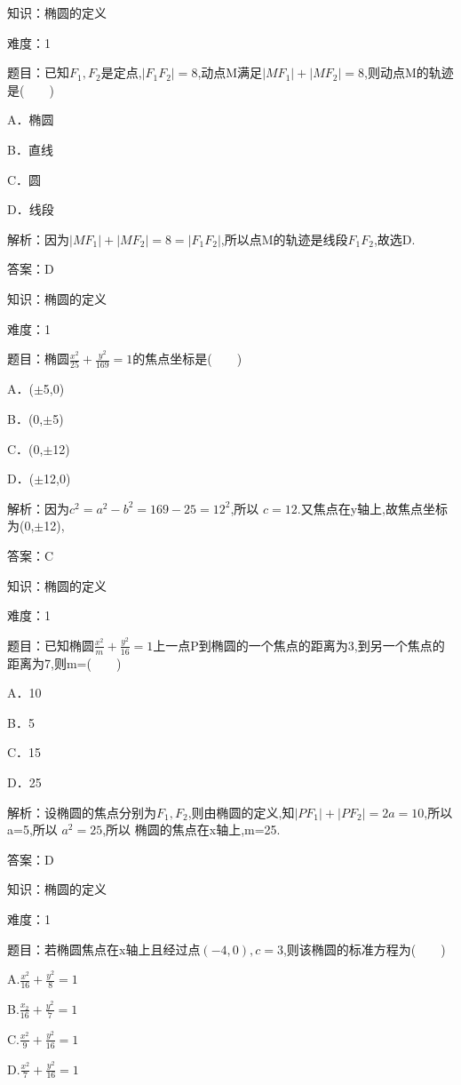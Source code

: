 \documentclass{article} %
\begin{document}
\noindent 

知识：椭圆的定义

难度：1


题目：已知$F_{1},F_{2}$是定点,$|F_1F_2|=8$,动点M满足$|MF_1|+|MF_2|=8$,则动点M的轨迹是(　　)

A．椭圆　　　　　　　 

B．直线

C．圆   

D．线段

解析：因为$|MF_1|+|MF_2|=8=|F_1F_2|$,所以点M的轨迹是线段$F_{1}F_{2}$,故选D.

答案：D



知识：椭圆的定义

难度：1

题目：椭圆$\frac{x^2}{25}+\frac{y^2}{169}=1$的焦点坐标是(　　)

A．(${\pm}$5,0)   

B．(0,${\pm}$5)

C．(0,${\pm}$12)   

D．(${\pm}$12,0)

解析：因为$c^{2}=a^{2}-b^{2}=169-25=12^{2}$,所以 $c=12$.又焦点在y轴上,故焦点坐标为(0,${\pm}$12),

答案：C



知识：椭圆的定义

难度：1

题目：已知椭圆$\frac{x^2}{m}+\frac{y^2}{16}=1$上一点P到椭圆的一个焦点的距离为3,到另一个焦点的距离为7,则m=(　　)

A．10  

B．5  

C．15  

D．25

解析：设椭圆的焦点分别为$F_{1},F_{2}$,则由椭圆的定义,知$|PF_1|+|PF_2|=2a=10$,所以 a=5,所以 $a^{2}=25$,所以 椭圆的焦点在x轴上,m=25.

答案：D



知识：椭圆的定义

难度：1

题目：若椭圆焦点在x轴上且经过点$(-4,0),c=3$,则该椭圆的标准方程为(　　)

A.$\frac{x^2}{16}+\frac{y^2}{8}=1$   

B.$\frac{x_2}{16}+\frac{y^2}{7}=1$

C.$\frac{x^2}{9}+\frac{y^2}{16}=1$   

D.$\frac{x^2}{7}+\frac{y^2}{16}=1$
\end{document}
